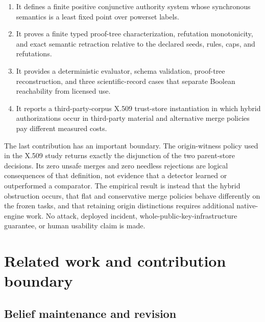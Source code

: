 \documentclass[pdflatex,sn-mathphys-num]{sn-jnl}
\providecommand{\tightlist}{%
  \setlength{\itemsep}{0pt}\setlength{\parskip}{0pt}}
\begin{document}
\begin{enumerate}
\def\labelenumi{\arabic{enumi}.}
\tightlist
\item
  It defines a finite positive conjunctive authority system whose synchronous semantics is a least fixed point over powerset labels.
\item
  It proves a finite typed proof-tree characterization, refutation monotonicity, and exact semantic retraction relative to the declared seeds, rules, caps, and refutations.
\item
  It provides a deterministic evaluator, schema validation, proof-tree reconstruction, and three scientific-record cases that separate Boolean reachability from licensed use.
\item
  It reports a third-party-corpus X.509 trust-store instantiation in which hybrid authorizations occur in third-party material and alternative merge policies pay different measured costs.
\end{enumerate}

The last contribution has an important boundary. The origin-witness policy used in the X.509 study returns exactly the disjunction of the two parent-store decisions. Its zero unsafe merges and zero needless rejections are logical consequences of that definition, not evidence that a detector learned or outperformed a comparator. The empirical result is instead that the hybrid obstruction occurs, that flat and conservative merge policies behave differently on the frozen tasks, and that retaining origin distinctions requires additional native-engine work. No attack, deployed incident, whole-public-key-infrastructure guarantee, or human usability claim is made.

\section{Related work and contribution boundary}\label{related-work-and-contribution-boundary}

\subsection{Belief maintenance and revision}\label{belief-maintenance-and-revision}
\end{document}
